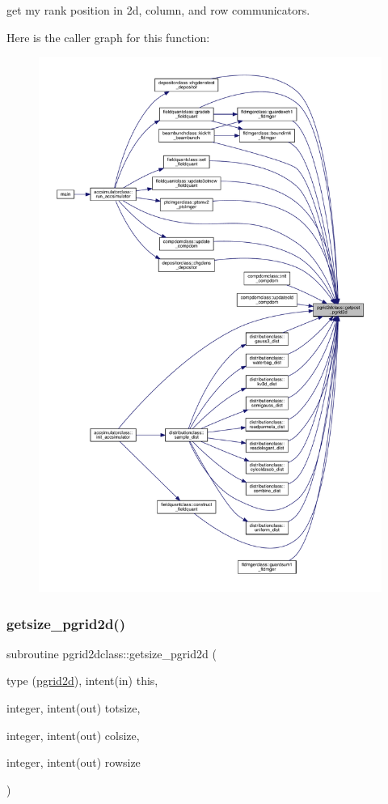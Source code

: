 get my rank position in 2d, column, and row communicators. 

Here is the caller graph for this function\+:
\nopagebreak
\begin{figure}[H]
\begin{center}
\leavevmode
\includegraphics[width=350pt]{namespacepgrid2dclass_a559d4550356f88440ae55fceda480de2_icgraph}
\end{center}
\end{figure}
\mbox{\label{namespacepgrid2dclass_ac088657db5b1deb05bb1ec732579ba53}} 
\subsubsection{\texorpdfstring{getsize\_pgrid2d()}{getsize\_pgrid2d()}}
{\footnotesize\ttfamily subroutine pgrid2dclass\+::getsize\+\_\+pgrid2d (\begin{DoxyParamCaption}\item[{type (\mbox{\hyperlink{namespacepgrid2dclass_structpgrid2dclass_1_1pgrid2d}{pgrid2d}}), intent(in)}]{this,  }\item[{integer, intent(out)}]{totsize,  }\item[{integer, intent(out)}]{colsize,  }\item[{integer, intent(out)}]{rowsize }\end{DoxyParamCaption})}



